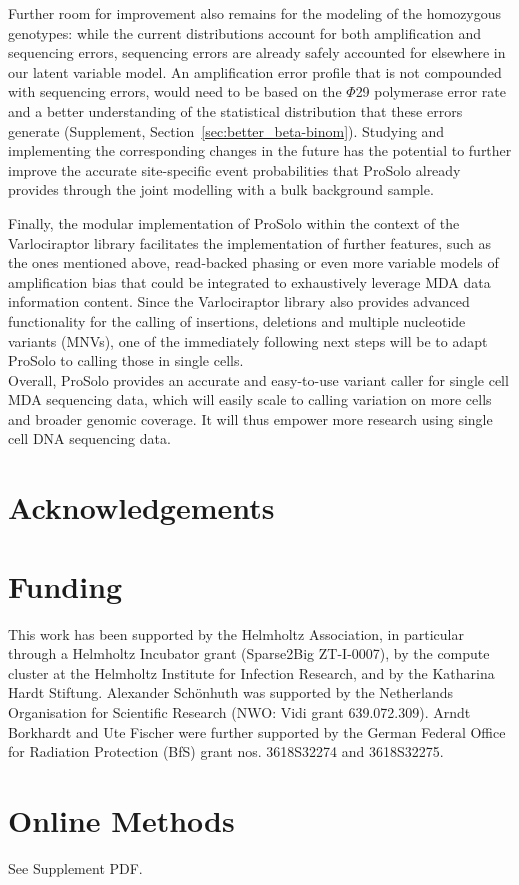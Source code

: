 \documentclass[12pt,inline]{wlscirep}
\begin{document}
Further room for improvement also remains for the modeling of the homozygous genotypes: while the current distributions account for both amplification and sequencing errors, sequencing errors are already safely accounted for elsewhere in our latent variable model.
An amplification error profile that is not compounded with sequencing errors, would need to be based on the $\Phi$29 polymerase error rate and a better understanding of the statistical distribution that these errors generate (Supplement, Section~\ref{sec:better_beta-binom}).
Studying and implementing the corresponding changes in the future has the potential to further improve the accurate site-specific event probabilities that ProSolo already provides through the joint modelling with a bulk background sample.

Finally, the modular implementation of ProSolo within the context of the Varlociraptor library\cite{koster_varlociraptor_2020} facilitates the implementation of further features, such as the ones mentioned above, read-backed phasing\cite{bohrson_linked-read_2019,hard_conbase:_2019} or even more variable models of amplification bias\cite{luquette_identification_2019} that could be integrated to exhaustively leverage MDA data information content.
Since the Varlociraptor library also provides advanced functionality for the calling of insertions, deletions and multiple nucleotide variants (MNVs), one of the immediately following next steps will be to adapt ProSolo to calling those in single cells.\\

Overall, ProSolo provides an accurate and easy-to-use variant caller for single cell MDA sequencing data, which will easily scale to calling variation on more cells and broader genomic coverage.
It will thus empower more research using single cell DNA sequencing data.



\section*{Acknowledgements}

\section*{Funding}
This work has been supported by the Helmholtz Association, in particular through a Helmholtz Incubator grant (Sparse2Big ZT-I-0007), by the compute cluster at the Helmholtz Institute for Infection Research, and by the Katharina Hardt Stiftung. Alexander Schönhuth was supported by the Netherlands Organisation for Scientific Research (NWO: Vidi grant 639.072.309). Arndt Borkhardt and Ute Fischer were further supported by the German Federal Office for Radiation Protection (BfS) grant nos. 3618S32274 and 3618S32275.

\section{Online Methods}
See Supplement PDF.
\end{document}
